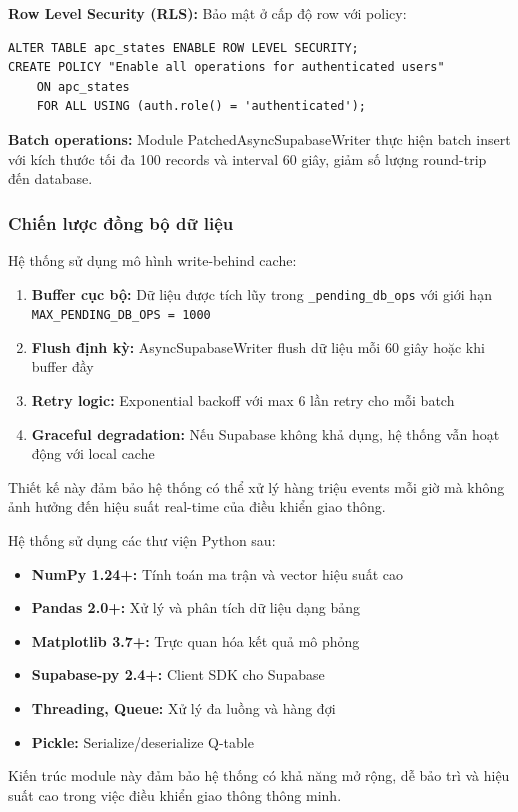 \textbf{Row Level Security (RLS):} Bảo mật ở cấp độ row với policy:
\begin{lstlisting}[style=sql]
ALTER TABLE apc_states ENABLE ROW LEVEL SECURITY;
CREATE POLICY "Enable all operations for authenticated users" 
    ON apc_states
    FOR ALL USING (auth.role() = 'authenticated');
\end{lstlisting}

\textbf{Batch operations:} Module PatchedAsyncSupabaseWriter thực hiện batch insert với kích thước tối đa 100 records và interval 60 giây, giảm số lượng round-trip đến database.

\subsubsection{Chiến lược đồng bộ dữ liệu}

Hệ thống sử dụng mô hình write-behind cache:

\begin{enumerate}
    \item \textbf{Buffer cục bộ:} Dữ liệu được tích lũy trong \texttt{\_pending\_db\_ops} với giới hạn \texttt{MAX\_PENDING\_DB\_OPS = 1000}
    
    \item \textbf{Flush định kỳ:} AsyncSupabaseWriter flush dữ liệu mỗi 60 giây hoặc khi buffer đầy
    
    \item \textbf{Retry logic:} Exponential backoff với max 6 lần retry cho mỗi batch
    
    \item \textbf{Graceful degradation:} Nếu Supabase không khả dụng, hệ thống vẫn hoạt động với local cache
\end{enumerate}

Thiết kế này đảm bảo hệ thống có thể xử lý hàng triệu events mỗi giờ mà không ảnh hưởng đến hiệu suất real-time của điều khiển giao thông.

Hệ thống sử dụng các thư viện Python sau:

\begin{itemize}
    \item \textbf{NumPy 1.24+:} Tính toán ma trận và vector hiệu suất cao
    \item \textbf{Pandas 2.0+:} Xử lý và phân tích dữ liệu dạng bảng
    \item \textbf{Matplotlib 3.7+:} Trực quan hóa kết quả mô phỏng
    \item \textbf{Supabase-py 2.4+:} Client SDK cho Supabase
    \item \textbf{Threading, Queue:} Xử lý đa luồng và hàng đợi
    \item \textbf{Pickle:} Serialize/deserialize Q-table
\end{itemize}

Kiến trúc module này đảm bảo hệ thống có khả năng mở rộng, dễ bảo trì và hiệu suất cao trong việc điều khiển giao thông thông minh.
